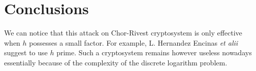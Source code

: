 \documentclass[12pt,a4paper,titlepage]{article}
\begin{document}
\section{Conclusions}

We can notice that this attack on Chor-Rivest cryptosystem is only effective when $h$ possesses a small factor. For example, L. Hernandez Encinas \textit{et alii} \cite{Enc04} suggest to use $h$ prime. Such a cryptosystem remains however useless nowadays essentially because of the complexity of the discrete logarithm problem.







\newpage
\appendix
\end{document}
